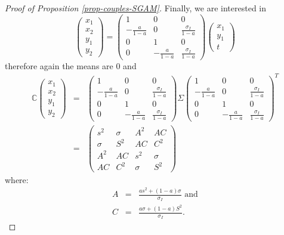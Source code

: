 \documentclass[
  12pt,
]{article}
\theoremstyle{definition}
\theoremstyle{definition}
\theoremstyle{definition}
\theoremstyle{definition}
\theoremstyle{remark}
\begin{document}
\begin{proof}[Proof of Proposition \ref{prop-couples-SGAM}]
Finally, we are interested in 
\[
\left( 
\begin{array}{c}
x_{1} \\ 
x_{2} \\ 
y_{1} \\ 
y_{2}%
\end{array}%
\right) =\left( 
\begin{array}{ccc}
1 & 0 & 0 \\ 
-\frac{a}{1-a} & 0 & \frac{\sigma_I}{1-a} \\ 
0 & 1 & 0 \\ 
0 & -\frac{a}{1-a} & \frac{\sigma_I}{1-a}%
\end{array}%
\right) \left( 
\begin{array}{c}
x_{1} \\ 
y_{1} \\ 
t%
\end{array}%
\right) 
\]%
therefore again the means are 0 and 
\begin{eqnarray*}
\mathbb{C}\left( 
\begin{array}{c}
x_{1} \\ 
x_{2} \\ 
y_{1} \\ 
y_{2}%
\end{array}%
\right) &=&\left( 
\begin{array}{ccc}
1 & 0 & 0 \\ 
-\frac{a}{1-a} & 0 & \frac{\sigma_I}{1-a} \\ 
0 & 1 & 0 \\ 
0 & -\frac{a}{1-a} & \frac{\sigma_I}{1-a}%
\end{array}%
\right) \Sigma \left( 
\begin{array}{ccc}
1 & 0 & 0 \\ 
-\frac{a}{1-a} & 0 & \frac{\sigma_I}{1-a} \\ 
0 & 1 & 0 \\ 
0 & -\frac{a}{1-a} & \frac{\sigma_I}{1-a}%
\end{array}%
\right) ^{T} \\
&=&\allowbreak \left( 
\begin{array}{cccc}
s^{2} & \sigma & A^{2} & AC \\ 
\sigma & S^{2} & AC & C^{2} \\ 
A^{2} & AC & s^{2} & \sigma \\ 
AC & C^{2} & \sigma & S^{2}%
\end{array}%
\right) \allowbreak
\end{eqnarray*}%
where:%
\begin{eqnarray*}
A &=&\frac{as^{2}+\left( 1-a\right) \sigma }{\sigma_I}\text{ \ and} \\
C &=&\frac{a\sigma +\left( 1-a\right) S^{2}}{\sigma_I}.
\end{eqnarray*}

\end{proof}
\end{document}
